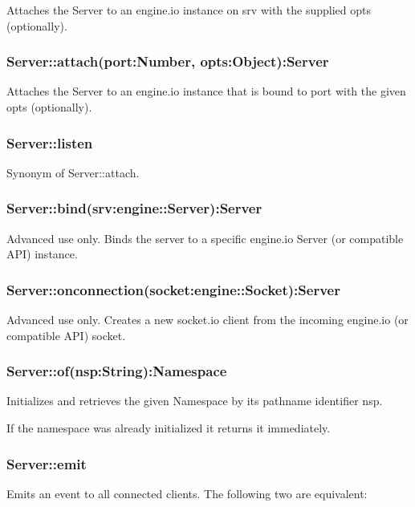 Attaches the {\ttfamily Server} to an engine.\+io instance on {\ttfamily srv} with the supplied {\ttfamily opts} (optionally).

\subsubsection*{Server\+::attach(port\+:\+Number, opts\+:\+Object)\+:Server}

Attaches the {\ttfamily Server} to an engine.\+io instance that is bound to {\ttfamily port} with the given {\ttfamily opts} (optionally).

\subsubsection*{Server\+::listen}

Synonym of {\ttfamily Server\+::attach}.

\subsubsection*{Server\+::bind(srv\+:engine\+::\+Server)\+:Server}

Advanced use only. Binds the server to a specific engine.\+io {\ttfamily Server} (or compatible A\+PI) instance.

\subsubsection*{Server\+::onconnection(socket\+:engine\+::\+Socket)\+:Server}

Advanced use only. Creates a new {\ttfamily socket.\+io} client from the incoming engine.\+io (or compatible A\+PI) {\ttfamily socket}.

\subsubsection*{Server\+::of(nsp\+:\+String)\+:Namespace}

Initializes and retrieves the given {\ttfamily Namespace} by its pathname identifier {\ttfamily nsp}.

If the namespace was already initialized it returns it immediately.

\subsubsection*{Server\+::emit}

Emits an event to all connected clients. The following two are equivalent\+:


